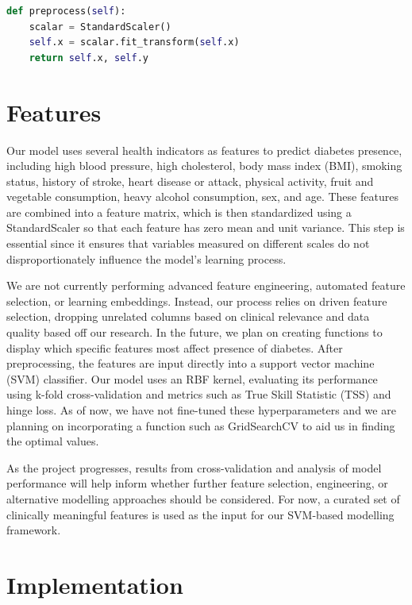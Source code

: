 \documentclass[11pt]{article}
\begin{document}
{\footnotesize
\begin{lstlisting}[language=Python]
def preprocess(self):
    scalar = StandardScaler()
    self.x = scalar.fit_transform(self.x)
    return self.x, self.y
\end{lstlisting}
}

\section{Features}

Our model uses several health indicators as features to predict diabetes presence, including high blood pressure, high cholesterol, body mass index (BMI), smoking status, history of stroke, heart disease or attack, physical activity, fruit and vegetable consumption, heavy alcohol consumption, sex, and age. These features are combined into a feature matrix, which is then standardized using a StandardScaler so that each feature has zero mean and unit variance. This step is essential since it ensures that variables measured on different scales do not disproportionately influence the model’s learning process.

We are not currently performing advanced feature engineering, automated feature selection, or learning embeddings. Instead, our process relies on driven feature selection, dropping unrelated columns based on clinical relevance and data quality based off our research. In the future, we plan on creating functions to display which specific features most affect presence of diabetes. After preprocessing, the features are input directly into a support vector machine (SVM) classifier. Our model uses an RBF kernel, evaluating its performance using k-fold cross-validation and metrics such as True Skill Statistic (TSS) and hinge loss. As of now, we have not fine-tuned these hyperparameters and we are planning on incorporating a function such as GridSearchCV to aid us in finding the optimal values.

As the project progresses, results from cross-validation and analysis of model performance will help inform whether further feature selection, engineering, or alternative modelling approaches should be considered. For now, a curated set of clinically meaningful features is used as the input for our SVM-based modelling framework.

\section{Implementation}
\end{document}
